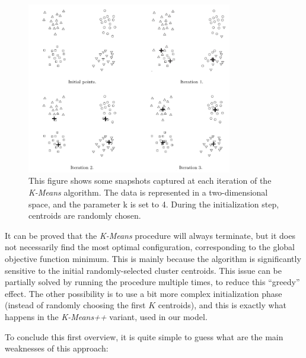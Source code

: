 \documentclass[12pt,a4paper,cucitura]{toptesi}
\begin{document}
\begin{figure}
\centering
\includegraphics[width=0.8\textwidth]{kmeans1.png}
\caption[\emph{K-Means} iterations]{This figure shows some snapshots captured at each iteration of the \emph{K-Means} algorithm. The data is represented in a two-dimensional space, and the parameter k is set to 4. During the initialization step, centroids are randomly chosen.}
\end{figure}

It can be proved that the \emph{K-Means} procedure will always terminate, but it does not necessarily find the most optimal configuration, corresponding to the global objective function minimum.
This is mainly because the algorithm is significantly sensitive to the initial randomly-selected cluster centroids. This issue can be partially solved by running the procedure multiple times, to reduce this ``greedy'' effect.
The other possibility is to use a bit more complex initialization phase (instead of randomly choosing the first $K$ centroids), and this is exactly what happens in the \emph{K-Means++} variant, used in our model.

To conclude this first overview, it is quite simple to guess what are the main weaknesses of this approach:
\end{document}
